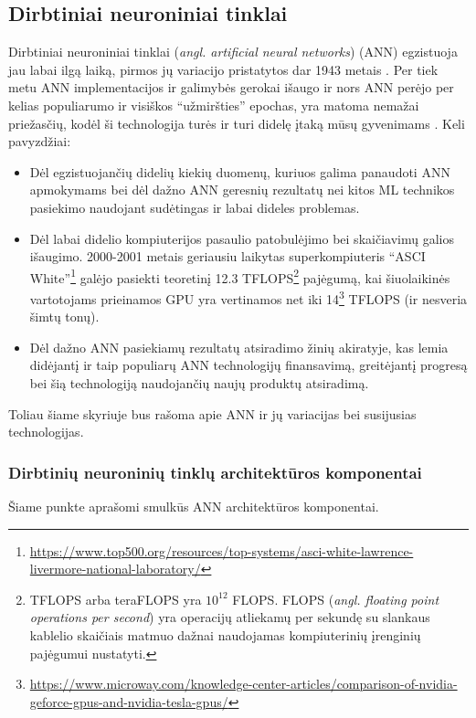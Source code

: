 \documentclass{VUMIFPSbakalaurinis}
\begin{document}
\subsection{Dirbtiniai neuroniniai tinklai}\label{subsec:neuro}
{
	Dirbtiniai neuroniniai tinklai (\textit{angl. artificial neural networks}) (ANN) egzistuoja jau labai ilgą laiką, pirmos jų variacijo pristatytos dar 1943 metais \cite{mcculloch_pitts_1943}. Per tiek metu ANN implementacijos ir galimybės gerokai išaugo ir nors ANN perėjo per kelias populiarumo ir visiškos \enquote{užmiršties} epochas, yra matoma nemažai priežasčių, kodėl ši technologija turės ir turi didelę įtaką mūsų gyvenimams \cite{handson}. Keli pavyzdžiai:
	\begin{itemize}
		\item Dėl egzistuojančių didelių kiekių duomenų, kuriuos galima panaudoti ANN apmokymams bei dėl dažno ANN geresnių rezultatų nei kitos ML technikos pasiekimo naudojant sudėtingas ir labai dideles problemas.
		
		\item Dėl labai didelio kompiuterijos pasaulio patobulėjimo bei skaičiavimų galios išaugimo. 2000-2001 metais geriausiu laikytas superkompiuteris \enquote{ASCI White}\footnote{\url{https://www.top500.org/resources/top-systems/asci-white-lawrence-livermore-national-laboratory/}} galėjo pasiekti teoretinį 12.3 TFLOPS\footnote{TFLOPS arba teraFLOPS yra \(10^{12}\) FLOPS. FLOPS (\textit{angl. floating point operations per second}) yra operacijų atliekamų per sekundę su slankaus kablelio skaičiais matmuo dažnai naudojamas kompiuterinių įrenginių pajėgumui nustatyti.} pajėgumą, kai šiuolaikinės vartotojams prieinamos GPU yra vertinamos net iki 14\footnote{\url{https://www.microway.com/knowledge-center-articles/comparison-of-nvidia-geforce-gpus-and-nvidia-tesla-gpus/}} TFLOPS (ir nesveria šimtų tonų).
		
		\item Dėl dažno ANN pasiekiamų rezultatų atsiradimo žinių akiratyje, kas lemia didėjantį ir taip populiarų ANN technologijų finansavimą, greitėjantį progresą bei šią technologiją naudojančių naujų produktų atsiradimą\cite{handson}.
	\end{itemize}
	
Toliau šiame skyriuje bus rašoma apie ANN ir jų variacijas bei susijusias technologijas.
}
\subsubsection{Dirbtinių neuroninių tinklų architektūros komponentai}\label{subsubsec:components}
Šiame punkte aprašomi smulkūs ANN architektūros komponentai.
\end{document}
